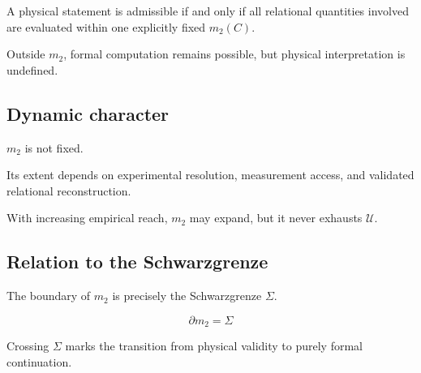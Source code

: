 A physical statement is admissible
if and only if
all relational quantities involved
are evaluated within one explicitly fixed $m_2(C)$.

Outside $m_2$,
formal computation remains possible,
but physical interpretation is undefined.

\subsection{Dynamic character}

$m_2$ is not fixed.

Its extent depends on
experimental resolution,
measurement access,
and validated relational reconstruction.

With increasing empirical reach,
$m_2$ may expand,
but it never exhausts $\mathcal{U}$.

\subsection{Relation to the Schwarzgrenze}

The boundary of $m_2$
is precisely the Schwarzgrenze $\Sigma$.

\[
\partial m_2 = \Sigma
\]

Crossing $\Sigma$
marks the transition
from physical validity
to purely formal continuation.
